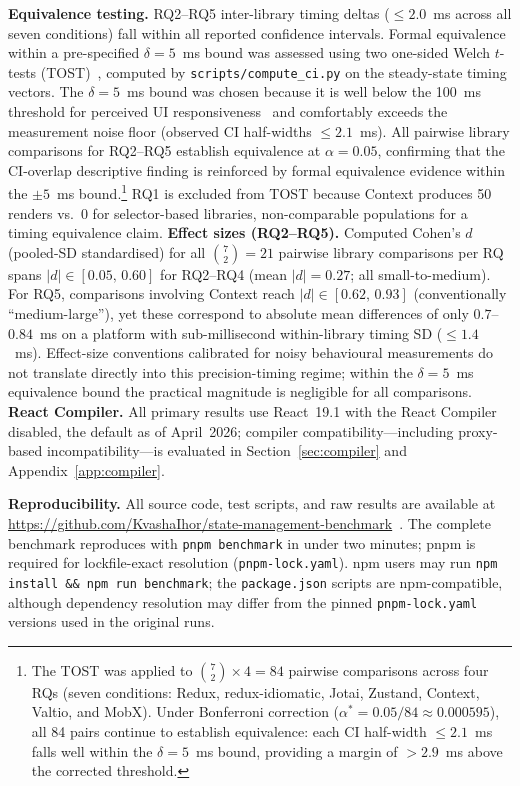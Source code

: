 \documentclass[conference]{IEEEtran}
\newcommand{\code}[1]{\texttt{\small #1}}
\begin{document}
\textbf{Equivalence testing.} RQ2--RQ5 inter-library timing deltas
($\leq 2.0$~ms across all seven conditions) fall within all reported confidence intervals. Formal
equivalence within a pre-specified $\delta{=}5$~ms bound was assessed
using two one-sided Welch $t$-tests (TOST)~\cite{b10}, computed by
\code{scripts/compute\_ci.py} on the steady-state timing vectors.  The
$\delta{=}5$~ms bound was chosen because it is well below the 100~ms
threshold for perceived UI responsiveness~\cite{b15} and comfortably
exceeds the measurement noise floor (observed CI half-widths $\leq 2.1$~ms). All
pairwise library comparisons for RQ2--RQ5 establish equivalence at
$\alpha{=}0.05$, confirming that the CI-overlap descriptive finding is
reinforced by formal equivalence evidence within the $\pm 5$~ms
bound.\footnote{The TOST was applied to $\binom{7}{2}\times 4 = 84$
pairwise comparisons across four RQs (seven conditions: Redux,
redux-idiomatic, Jotai, Zustand, Context, Valtio, and MobX).
Under Bonferroni correction
($\alpha^*=0.05/84\approx 0.000595$), all 84 pairs continue to establish
equivalence: each CI half-width $\leq 2.1$~ms falls well within the
$\delta{=}5$~ms bound, providing a margin of $> 2.9$~ms above the
corrected threshold.}
RQ1 is excluded from TOST because Context produces 50 renders vs.\ 0
for selector-based libraries, non-comparable populations for a timing
equivalence claim.
\textbf{Effect sizes (RQ2--RQ5).}
Computed Cohen's $d$ (pooled-SD standardised) for all
$\binom{7}{2}=21$ pairwise library comparisons per RQ spans
$|d| \in [0.05,\, 0.60]$ for RQ2--RQ4 (mean $|d|=0.27$; all
small-to-medium). For RQ5, comparisons involving Context reach
$|d| \in [0.62,\, 0.93]$ (conventionally ``medium-large''), yet
these correspond to absolute mean differences of only
$0.7$--$0.84$~ms on a platform with sub-millisecond within-library
timing SD ($\leq 1.4$~ms). Effect-size conventions calibrated for
noisy behavioural measurements do not translate directly into this
precision-timing regime; within the $\delta{=}5$~ms equivalence bound
the practical magnitude is negligible for all comparisons.
\textbf{React Compiler.} All primary results use React~19.1 with the
React Compiler disabled, the default as of April~2026; compiler
compatibility---including proxy-based incompatibility---is evaluated in
Section~\ref{sec:compiler} and Appendix~\ref{app:compiler}.

\textbf{Reproducibility.} All source code, test scripts, and raw results
are available at \url{https://github.com/KvashaIhor/state-management-benchmark}~\cite{b18}.
The complete benchmark
reproduces with \code{pnpm benchmark} in under two minutes; pnpm
is required for lockfile-exact resolution (\code{pnpm-lock.yaml}).
npm users may run \code{npm install \&\& npm run benchmark}; the
\code{package.json} scripts are npm-compatible, although dependency
resolution may differ from the pinned \code{pnpm-lock.yaml} versions
used in the original runs.
\end{document}

